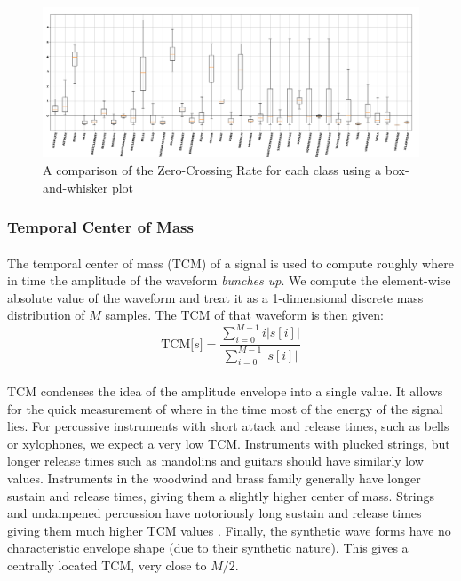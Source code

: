 \documentclass[12pt,letterpaper]{article}
\begin{document}
\begin{figure}[H]
\begin{center}
\includegraphics[scale=0.3]{../FiguresFeatures/ZXR}
\end{center}
\caption{A comparison of the Zero-Crossing Rate for each class using a box-and-whisker plot}
\label{fig-FeatureZXR}
\end{figure}


\subsubsection{Temporal Center of Mass}

\paragraph*{}The temporal center of mass (TCM) of a signal is used to compute roughly where in time the amplitude of the waveform \textit{bunches up}. We compute the element-wise absolute value of the waveform and treat it as a 1-dimensional discrete mass distribution of $M$ samples.
The TCM of that waveform is then given:
\begin{equation}
\label{eqn-FeatureTCM}
\text{TCM}\big[ s \big] = \frac{\sum_{i=0}^{M-1}i \big|s[i]\big|}
{\sum_{i=0}^{M-1}\big|s[i]\big|}
\end{equation}

\paragraph*{}TCM condenses the idea of the amplitude envelope into a single value. It allows for the quick measurement of where in the time most of the energy of the signal lies. For percussive instruments with short attack and release times, such as bells or xylophones, we expect a very low TCM. Instruments with plucked strings, but longer release times such as mandolins and guitars should have similarly low values. Instruments in the woodwind and brass family generally have longer sustain and release times, giving them a slightly higher center of mass. Strings and undampened percussion have notoriously long sustain and release times giving them much higher TCM values \cite{Olson,White}. Finally, the synthetic wave forms have no characteristic  envelope shape (due to their synthetic nature). This gives a centrally located TCM, very close to $M/2$.
\end{document}
